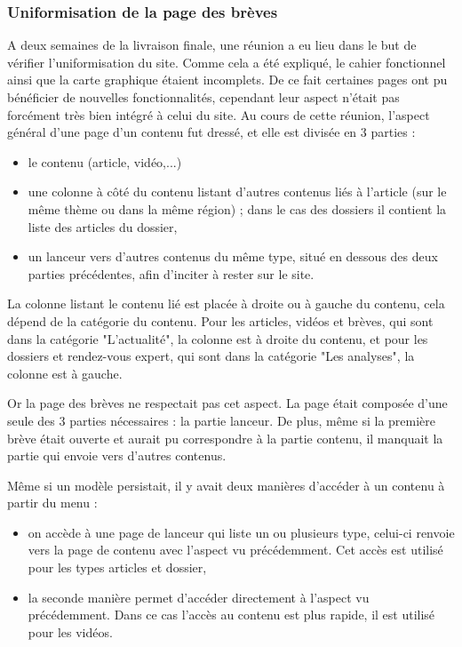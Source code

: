 \documentclass[12pt,a4paper]{article}
\begin{document}
\subsubsection{Uniformisation de la page des brèves}
A deux semaines de la livraison finale, une réunion a eu lieu dans le but de vérifier l'uniformisation du site. Comme cela a été expliqué, le cahier fonctionnel ainsi que la carte graphique étaient incomplets. De ce fait certaines pages ont pu bénéficier de nouvelles fonctionnalités, cependant leur aspect n'était pas forcément très bien intégré à celui du site. Au cours de cette réunion, l'aspect général d'une page d'un contenu fut dressé, et elle est divisée en 3 parties :
\begin{itemize}
\item le contenu (article, vidéo,...)
\item une colonne à côté du contenu listant d'autres contenus liés à l'article (sur le même thème ou dans la même région) ; dans le cas des dossiers il contient la liste des articles du dossier,
\item un lanceur vers d'autres contenus du même type, situé en dessous des deux parties précédentes, afin d'inciter à rester sur le site.
\end{itemize}\par
La colonne listant le contenu lié est placée à droite ou à gauche du contenu, cela dépend de la catégorie du  contenu. Pour les articles, vidéos et brèves, qui sont dans la catégorie "L'actualité", la colonne est à droite du contenu, et pour les dossiers et rendez-vous expert, qui sont dans la catégorie "Les analyses", la colonne est à gauche.\par
\bigskip
Or la page des brèves ne respectait pas cet aspect. La page était composée d'une seule des 3 parties nécessaires : la partie lanceur. De plus, même si la première brève était ouverte et aurait pu correspondre à la partie contenu,  il manquait la partie qui envoie vers d'autres contenus.\par 
Même si un modèle persistait, il y avait deux manières d'accéder à un contenu à partir du menu : 
\begin{itemize}
\item on accède à une page de lanceur qui liste un ou plusieurs type, celui-ci renvoie vers la page de contenu avec l'aspect vu précédemment. Cet accès est utilisé pour les types articles et dossier,
\item la seconde manière permet d'accéder directement à l'aspect vu précédemment. Dans ce cas l'accès au contenu est plus rapide, il est utilisé pour les vidéos. 
\end{itemize}\par 
\end{document}
